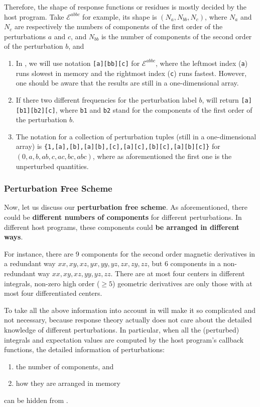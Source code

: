 \begin{description}
    Therefore, the shape of response functions or residues is mostly decided
    by the host program. Take $\mathcal{E}^{abbc}$ for example, its shape is
    $(N_{a},N_{bb},N_{c})$, where $N_{a}$ and $N_{c}$ are respectively the
    numbers of components of the first order of the perturbations $a$ and $c$,
    and $N_{bb}$ is the number of components of the second order of the
    perturbation $b$, and
    \begin{enumerate}
      \item In \LibName, we will use notation \texttt{[a][bb][c]} for
        $\mathcal{E}^{abbc}$, where the leftmost index (\texttt{a}) runs
        slowest in memory and the rightmost index (\texttt{c}) runs fastest.
        However, one should be aware that the results are still in a
        one-dimensional array.
      \item If there two different frequencies for the perturbation label
        $b$, \LibName will return \texttt{[a][b1][b2][c]}, where \texttt{b1}
        and \texttt{b2} stand for the components of the first order of the
        perturbation $b$.
      \item The notation for a collection of perturbation tuples (still in a
        one-dimensional array) is
        \texttt{\{1,[a],[b],[a][b],[c],[a][c],[b][c],[a][b][c]\}}
        for $(0,a,b,ab,c,ac,bc,abc)$, where as aforementioned the first one
        is the unperturbed quantities.
    \end{enumerate}
\end{description}

\subsubsection{Perturbation Free Scheme}

Now, let us discuss our \textbf{perturbation free scheme}. As aforementioned,
there could be \textbf{different numbers of components} for different
perturbations. In different host programs, these components could \textbf{be
arranged in different ways}.

For instance, there are 9 components for the second order magnetic derivatives
in a redundant way $xx,xy,xz,yx,yy,yz,zx,zy,zz$, but 6 components in a
non-redundant way $xx,xy,xz,yy,yz,zz$. There are at most four centers in
different integrals, non-zero high order ($\ge 5$) geometric derivatives are
only those with at most four differentiated centers.

To take all the above information into account in \LibName will make it so
complicated and not necessary, because response theory actually does not care
about the detailed knowledge of different perturbations. In particular, when
all the (perturbed) integrals and expectation values are computed by the host
program's callback functions, the detailed information of perturbations:
\begin{enumerate}
  \item the number of components, and
  \item how they are arranged in memory
\end{enumerate}
can be hidden from \LibName.

